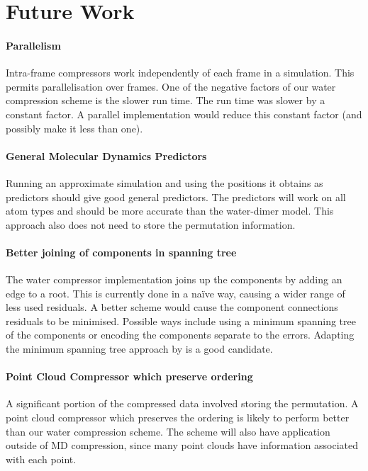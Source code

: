 \documentclass[a4paper]{report}
\begin{document}
\section{Future Work}

\paragraph{Parallelism}

Intra-frame compressors work independently of each frame in a simulation. This
permits parallelisation over frames. One of the negative factors of our water
compression scheme is the slower run time. The run time was slower by a
constant factor. A parallel implementation would reduce this constant factor
(and possibly make it less than one).

\paragraph{General Molecular Dynamics Predictors}

Running an approximate simulation and using the positions it obtains as
predictors should give good general predictors. The predictors will work on
all atom types and should be more accurate than the water-dimer model. This
approach also does not need to store the permutation information.

\paragraph{Better joining of components in spanning tree}

The water compressor implementation joins up the components by adding an edge
to a root. This is currently done in a na\"{i}ve way, causing a wider range of
less used residuals. A better scheme would cause the component connections
residuals to be minimised. Possible ways include using a minimum spanning tree
of the components or encoding the components separate to the errors. Adapting
the minimum spanning tree approach by \citet{chen2005lcp} is a good candidate.

\paragraph{Point Cloud Compressor which preserve ordering}

A significant portion of the compressed data involved storing the
permutation. A point cloud compressor which preserves the ordering is likely
to perform better than our water compression scheme. The scheme will also have
application outside of MD compression, since many point clouds have
information associated with each point.

\nocite{*}

\end{document}
